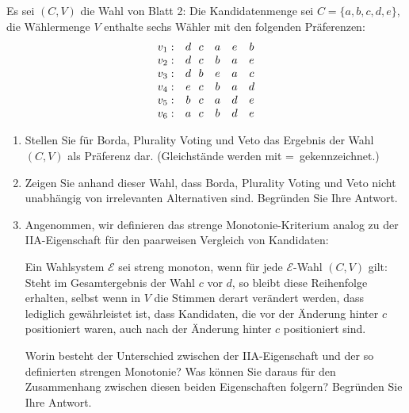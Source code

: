 \documentclass[12pt]{article}
\newcommand\be{\begin{enumerate}}
\newcommand\ee{\end{enumerate}}
\newcommand{\vs}{\mathcal{E}}
\newcommand{\wahl}{(C,V)}
\newcommand{\bAnt}{Begr\"unden Sie Ihre Antwort.}
\begin{document}
Es sei $(C,V)$ die 
Wahl von Blatt 2: Die Kandidatenmenge sei $C=\{a,b,c,d,e\}$, die W\"ahlermenge $V$ enthalte
sechs W\"ahler mit den folgenden Pr\"aferenzen:
\[
\begin{array}{rc@{\ \ }ccccc}
	v_1: 	& d & c & a & e & b	\\
	v_2:  & d & c & b & a & e 	\\
	v_3:  & d & b & e & a & c 	\\
	v_4:	& e & c & b & a & d 	\\
	v_5: 	& b & c & a & d & e	\\
	v_6: 	& a & c & b & d & e	\\
\end{array}
\]

\be
	\item Stellen Sie f\"ur Borda, Plurality Voting und Veto das Ergebnis der 
	Wahl $\wahl$ als Pr\"aferenz dar. (Gleichst\"ande werden mit \glqq =\grqq\, gekennzeichnet.)
	\item Zeigen Sie anhand dieser Wahl, dass Borda, Plurality Voting und Veto nicht
	unabh\"angig von irrelevanten Alternativen sind. \bAnt
	\item Angenommen, wir definieren das strenge Monotonie-Kriterium analog zu der IIA-Eigenschaft
	f\"ur den paarweisen Vergleich von Kandidaten:
	
	Ein Wahlsystem $\vs$ sei streng monoton, wenn f\"ur jede $\vs$-Wahl $\wahl$ gilt: Steht im Gesamtergebnis
	der Wahl $c$ vor $d$, so bleibt diese Reihenfolge erhalten, selbst wenn in $V$ die Stimmen derart 
	ver\"andert werden, dass lediglich gew\"ahrleistet ist, dass Kandidaten, die vor der \"Anderung hinter 
	$c$ positioniert waren, auch nach der \"Anderung hinter $c$ positioniert sind.

	Worin besteht der Unterschied zwischen der IIA-Eigenschaft und der so definierten strengen 
	Monotonie? Was k\"onnen Sie daraus f\"ur den Zusammenhang zwischen diesen beiden Eigenschaften folgern? 
	\bAnt
\ee
\end{document}
